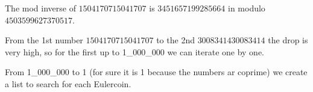 \documentclass[12pt]{scrartcl}
\begin{document}
The mod inverse of $1504170715041707$ is $3451657199285664$ in modulo $4503599627370517$.

From the 1st number $1504170715041707$ to the 2nd $3008341430083414$ the drop is very high, so for the first up to 1_000_000 we can iterate one by one.

From 1_000_000 to 1 (for sure it is 1 because the numbers ar coprime) we create a list to search for each Eulercoin.
\end{document}
